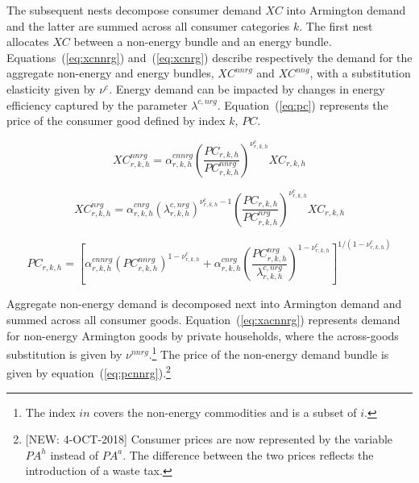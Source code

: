 \documentclass[11pt,letterpaper]{report}
\begin{document}
The subsequent nests decompose consumer demand $\mathit{XC}$ into Armington
demand and the latter are summed across all consumer categories $k$. The first
nest allocates $\mathit{XC}$ between a non-energy bundle and an energy bundle.
Equations~(\ref{eq:xcnnrg}) and~(\ref{eq:xcnrg}) describe respectively the
demand for the aggregate non-energy and energy bundles,
$\mathit{XC}^{\mathit{nnrg}}$ and $\mathit{XC}^{\mathit{nng}}$, with a
substitution elasticity given by $\nu^c$. Energy demand
can be impacted by changes in energy efficiency captured
by the parameter $\lambda^{c,\mathit{nrg}}$. Equation~(\ref{eq:pc}) represents the
price of the consumer good defined by index $k$, $\mathit{PC}$.

\begin{equation}
\label{eq:xcnnrg}
\mathit{XC}^{\mathit{nnrg}}_{r,k,h} =
   \alpha^{\mathit{cnnrg}}_{r,k,h}
   \left(
      \frac{ \mathit{PC}_{r,k,h}} {\mathit{PC}^{\mathit{nnrg}}_{r,k,h}}
   \right)^{\nu^c_{r,k,h}}
   \mathit{XC}_{r,k,h}
\end{equation}

\begin{equation}
\label{eq:xcnrg}
\mathit{XC}^{\mathit{nrg}}_{r,k,h} =
   \alpha^{\mathit{cnrg}}_{r,k,h}
   \left(\lambda^{c,\mathit{nrg}}_{r,k,h} \right)^{\nu^c_{r,k,h}-1}
   \left(
      \frac{\mathit{PC}_{r,k,h}} {\mathit{PC}^{\mathit{nrg}}_{r,k,h}}
   \right)^{\nu^c_{r,k,h}}
   \mathit{XC}_{r,k,h}
\end{equation}

\begin{equation}
\label{eq:pc}
\mathit{PC}_{r,k,h} =
   \left[
      \alpha^{\mathit{cnnrg}}_{r,k,h}
      \left( {\mathit{PC}^{\mathit{nnrg}}_{r,k,h}}
      \right)^{1-\nu^c_{r,k,h}}
   +  \alpha^{\mathit{cnrg}}_{r,k,h}
      \left( \displaystyle \frac{\mathit{PC}^{\mathit{nrg}}_{r,k,h}} {\lambda^{c,\mathit{nrg}}_{r,k,h}}
      \right)^{1-\nu^c_{r,k,h}}
   \right]^{1/(1-\nu^c_{r,k,h})}
\end{equation}

Aggregate non-energy demand is decomposed next into Armington demand and summed
across all consumer goods. Equation~(\ref{eq:xacnnrg}) represents demand for
non-energy Armington goods by private households, where the across-goods
substitution is given by $\nu^{\mathit{nnrg}}$.\footnote{The index $\mathit{in}$
covers the non-energy commodities and is a subset of $i$.} The price of the
non-energy demand bundle is given by equation~(\ref{eq:pcnnrg}).\footnote{[NEW: 4-OCT-2018] Consumer prices are now represented by the variable $\mathit{PA}^h$
instead of $\mathit{PA}^a$. The difference between the two prices reflects the
introduction of a waste tax.}
\end{document}
